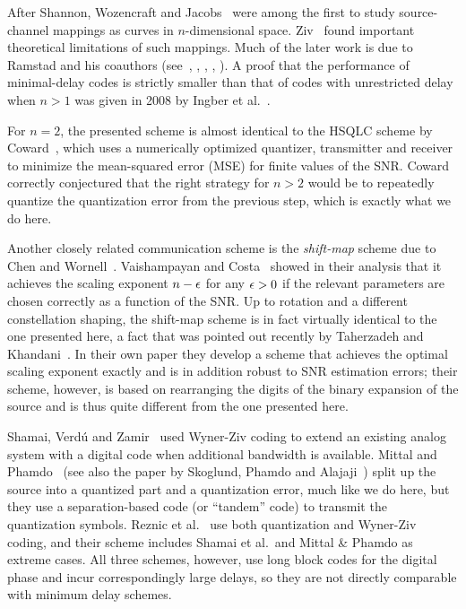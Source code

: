 After Shannon, Wozencraft and Jacobs~\cite{WozencraftJ1965} were among the first
to study source-channel mappings as curves in $n$-dimensional space.
Ziv~\cite{Ziv1970} found important theoretical limitations of such mappings.
Much of the later work is due to Ramstad and his coauthors
(see~\cite{Ramstad2002}, \cite{FloorR2006}, \cite{CowardR2000,CowardR2000a},
\cite{WernerssonSR2007}, \cite{HeklandFR2009}). A proof that the performance of
minimal-delay codes is strictly smaller than that of codes with unrestricted
delay when $n>1$ was given in 2008 by Ingber et al.~\cite{IngberLZF2008}.

For $n=2$, the presented scheme is almost identical to the HSQLC scheme by
Coward~\cite{Coward2001}, which uses a numerically optimized quantizer,
transmitter and receiver to minimize the mean-squared error (MSE) for finite
values of the SNR. Coward correctly conjectured that the right strategy for $n >
2$ would be to repeatedly quantize the quantization error from the previous
step, which is exactly what we do here.

Another closely related communication scheme is the \emph{shift-map} scheme due
to Chen and Wornell~\cite{ChenW1998}.  Vaishampayan and
Costa~\cite{VaishampayanC2003} showed in their analysis that it achieves the
scaling exponent $n-\epsilon$ for any $\epsilon > 0$ if the relevant parameters are chosen
correctly as a function of the SNR. Up to rotation and a different constellation
shaping, the shift-map scheme is in fact virtually identical to the one
presented here, a fact that was pointed out recently by Taherzadeh and
Khandani~\cite{TaherzadehK2008}. In their own paper they develop a scheme that
achieves the optimal scaling exponent exactly and is in addition robust to SNR
estimation errors; their scheme, however, is based on rearranging the digits of
the binary expansion of the source and is thus quite different from the one
presented here.

Shamai, Verd\'u and Zamir~\cite{ShamaiVZ1998} used Wyner-Ziv coding to extend an
existing analog system with a digital code when additional bandwidth is
available. Mittal and Phamdo~\cite{MittalP2002} (see also the paper by Skoglund,
Phamdo and Alajaji~\cite{SkoglundPA2002}) split up the source into a quantized
part and a quantization error, much like we do here, but they use a
separation-based code (or ``tandem'' code) to transmit the quantization symbols.
Reznic et al.~\cite{ReznicFZ2006} use both quantization and Wyner-Ziv coding,
and their scheme includes Shamai et al.\ and Mittal \& Phamdo as extreme cases.
All three schemes, however, use long block codes for the digital phase and incur
correspondingly large delays, so they are not directly comparable with minimum
delay schemes.














